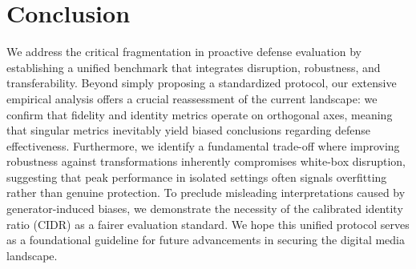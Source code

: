 \documentclass{article}
\begin{document}
\begin{table}[t!]
\centering
\caption{Disruption effectiveness of PGD on DiffAE under varying sampling steps}
\label{tab:diffusion_sampling_steps}
\end{table}

\section{Conclusion}
We address the critical fragmentation in proactive defense evaluation by establishing a unified benchmark that integrates disruption, robustness, and transferability. Beyond simply proposing a standardized protocol, our extensive empirical analysis offers a crucial reassessment of the current landscape: we confirm that fidelity and identity metrics operate on orthogonal axes, meaning that singular metrics inevitably yield biased conclusions regarding defense effectiveness. Furthermore, we identify a fundamental trade-off where improving robustness against transformations inherently compromises white-box disruption, suggesting that peak performance in isolated settings often signals overfitting rather than genuine protection. To preclude misleading interpretations caused by generator-induced biases, we demonstrate the necessity of the calibrated identity ratio (CIDR) as a fairer evaluation standard. We hope this unified protocol serves as a foundational guideline for future advancements in securing the digital media landscape.

\end{document}
